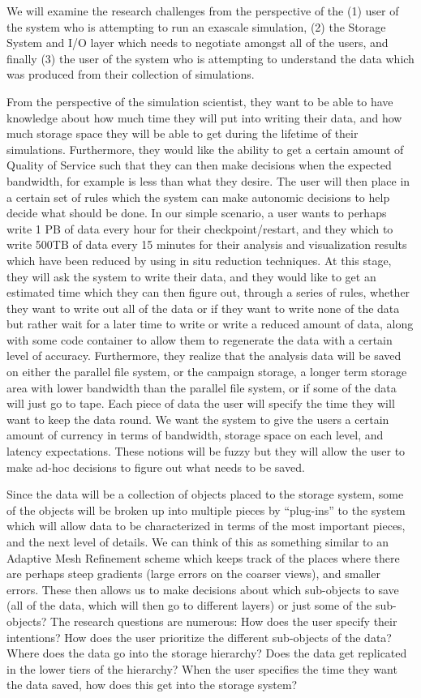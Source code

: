 We will examine the research challenges from the perspective of the (1) user
of the system who is attempting to run an exascale simulation, (2) the
Storage System and I/O layer which needs to negotiate amongst all of the
users, and finally (3) the user of the system who is attempting to
understand the data which was produced from their collection of simulations.

From the perspective of the simulation scientist, they want to be able to
have knowledge about how much time they will put into writing their data,
and how much storage space they will be able to get during the lifetime of
their simulations. Furthermore, they would like the ability to get a certain
amount of Quality of Service such that they can then make decisions when the
expected bandwidth, for example is less than what they desire. The user will
then place in a certain set of rules which the system can make autonomic
decisions to help decide what should be done. In our simple scenario, a user
wants to perhaps write 1 PB of data every hour for their checkpoint/restart,
and they which to write 500TB of data every 15 minutes for their analysis
and visualization results which have been reduced by using in situ reduction
techniques. At this stage, they will ask the system to write their data, and
they would like to get an estimated time which they can then figure out,
through a series of rules, whether they want to write out all of the data or
if they want to write none of the data but rather wait for a later time to
write or write a reduced amount of data, along with some code container to
allow them to regenerate the data with a certain level of accuracy.
Furthermore, they realize that the analysis data will be saved on either the
parallel file system, or the campaign storage, a longer term storage area
with lower bandwidth than the parallel file system, or if some of the data
will just go to tape. Each piece of data the user will specify the time they
will want to keep the data round. We want the system to give the users a
certain amount of currency in terms of bandwidth, storage space on each
level, and latency expectations. These notions will be fuzzy but they will
allow the user to make ad-hoc decisions to figure out what needs to be
saved.

Since the data will be a collection of objects placed to the storage system,
some of the objects will be broken up into multiple pieces by ``plug-ins''
to the system which will allow data to be characterized in terms of the most
important pieces, and the next level of details. We can think of this as
something similar to an Adaptive Mesh Refinement scheme which keeps track of
the places where there are perhaps steep gradients (large errors on the
coarser views), and smaller errors. These then allows us to make decisions
about which sub-objects to save (all of the data, which will then go to
different layers) or just some of the sub-objects? The research questions
are numerous: How does the user specify their intentions? How does the user
prioritize the different sub-objects of the data? Where does the data go
into the storage hierarchy? Does the data get replicated in the lower tiers
of the hierarchy? When the user specifies the time they want the data saved,
how does this get into the storage system?

